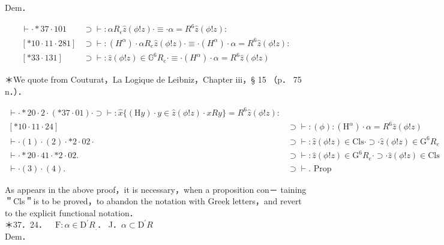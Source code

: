 \documentclass[10pt]{article}
\begin{document}
Dem．

\[
\begin{array}{ll}
\vdash \cdot * 37 \cdot 101 & \supset \vdash: \alpha R_{\epsilon} \hat{z}(\phi!z) \cdot \equiv \cdot \alpha=R^{6} \hat{z}(\phi!z): \\
{[* 10 \cdot 11 \cdot 281]} & \supset \vdash:\left(H^{\alpha}\right) \cdot \alpha R_{e} \hat{z}(\phi!z) \cdot \equiv \cdot\left(H^{\alpha}\right) \cdot \alpha=R^{6} \hat{z}(\phi!z): \\
{[* 33 \cdot 131]} & \supset \vdash: \hat{z}(\phi!z) \in \mathbb{G}^{6} R_{e} \cdot \equiv \cdot\left(H^{\alpha}\right) \cdot \alpha=R^{6} \hat{z}(\phi!z) \tag{1}
\end{array}
\]

＊We quote from Couturat，La Logique de Leibniz，Chapter iii，§ 15 （p． 75 n．）．

\[
\begin{array}{ll}
\vdash \cdot * 20 \cdot 2 \cdot(* 37 \cdot 01) \cdot \supset \vdash: \hat{x}\{(\mathrm{H} y) \cdot y \in \hat{z}(\phi!z) \cdot x R y\}=R^{6} \hat{z}(\phi!z): \\
{[* 10 \cdot 11 \cdot 24]} & \supset \vdash:(\phi):\left(\mathrm{H}^{\alpha}\right) \cdot \alpha=R^{6} \hat{z}(\phi!z) \\
\vdash \cdot(1) \cdot(2) \cdot * 2 \cdot 02 \cdot & \supset \vdash: \hat{z}(\phi!z) \in \mathrm{Cls} \cdot \supset \cdot \hat{z}(\phi!z) \in \mathrm{G}^{6} R_{e} \\
\vdash \cdot * 20 \cdot 41 \cdot * 2 \cdot 02 . & \supset \vdash: \hat{z}(\phi!z) \in \mathrm{G}^{6} R_{e} \cdot \supset \cdot \hat{z}(\phi!z) \in \mathrm{Cls}  \tag{4}\\
\vdash \cdot(3) \cdot(4) . & \supset \vdash . \text { Prop }
\end{array}
\]

As appears in the above proof，it is necessary，when a proposition con－ taining＂Cls＂is to be proved，to abandon the notation with Greek letters，and revert to the explicit functional notation．\\
＊37．24．$\quad \mathrm{F}: \alpha \in \mathrm{D}^{\prime} R_{.}$． J．$\alpha \subset \mathrm{D}^{\prime} R$\\
Dem．
\end{document}
